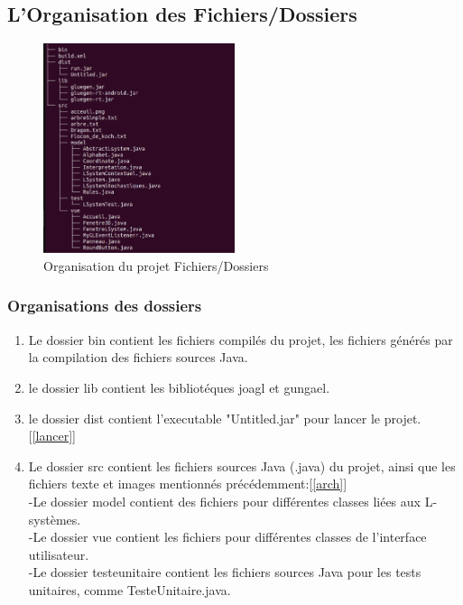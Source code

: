 \subsection{L'Organisation des  Fichiers/Dossiers}
\begin{figure}[h!]
  \centering
  \includegraphics[width=0.5\textwidth]{images/tree.png}
  \caption{Organisation du projet Fichiers/Dossiers}
  \label{fig:organisation}
\end{figure}

  \subsubsection{Organisations des dossiers} 

       \begin{enumerate}
           \item Le dossier bin contient les fichiers compilés du projet, les fichiers générés par la compilation des fichiers sources Java.
           \item  le dossier lib contient les bibliotéques joagl et gungael.
           \item le dossier dist contient l'executable "Untitled.jar" pour lancer le projet.[\ref{lancer}]
         
        
        \item Le dossier src contient les fichiers sources Java (.java) du projet, ainsi que les fichiers texte et images mentionnés précédemment:[\ref{arch}]\\
            -Le dossier model contient des fichiers  pour différentes classes liées aux L-systèmes.\\
            -Le dossier vue contient les fichiers pour différentes classes de l'interface utilisateur.\\
            -Le dossier testeunitaire contient les fichiers sources Java pour les tests unitaires, comme TesteUnitaire.java.\\
       \end{enumerate}
       
         
		
         
